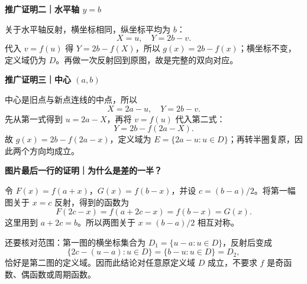 \clearpage
\begin{proofbox}
\textbf{推广证明二｜水平轴 $y=b$}


关于水平轴反射，横坐标相同，纵坐标平均为 $b$：
\[X=u,\quad Y=2b-v.\]
代入 $v=f(u)$ 得 $Y=2b-f(X)$，所以 $g(x)=2b-f(x)$；横坐标不变，定义域仍为 $D$。再做一次反射回到原图，故是完整的双向对应。

\end{proofbox}
\clearpage
\begin{proofbox}
\textbf{推广证明三｜中心 $(a,b)$}


中心是旧点与新点连线的中点，所以
\[X=2a-u,\quad Y=2b-v.\]
先从第一式得到 $u=2a-X$，再将 $v=f(u)$ 代入第二式：
\[Y=2b-f(2a-X).\]
故 $g(x)=2b-f(2a-x)$，定义域为 $E=\{2a-u:u\in D\}$；再转半圈复原，因此两个方向均成立。

\end{proofbox}
\clearpage
\begin{proofbox}
\textbf{图片最后一行的证明｜为什么是差的一半？}


令 $F(x)=f(a+x)$，$G(x)=f(b-x)$，并设 $c=(b-a)/2$。将第一幅图关于 $x=c$ 反射，得到的函数为
\[F(2c-x)=f(a+2c-x)=f(b-x)=G(x).\]
这里用到 $a+2c=b$。所以两图关于 $x=(b-a)/2$ 相互对称。

还要核对范围：第一图的横坐标集合为 $D_1=\{u-a:u\in D\}$，反射后变成
\[\{2c-(u-a):u\in D\}=\{b-u:u\in D\}=D_2,\]
恰好是第二图的定义域。因而此结论对任意原定义域 $D$ 成立，不要求 $f$ 是奇函数、偶函数或周期函数。

\end{proofbox}


